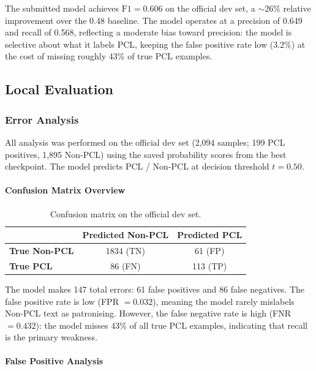 \documentclass[11pt,a4paper]{article}
\begin{document}
The submitted model achieves $\text{F1} = 0.606$ on the official dev set, a $\sim$26\% relative improvement over the 0.48 baseline. The model operates at a precision of 0.649 and recall of 0.568, reflecting a moderate bias toward precision: the model is selective about what it labels PCL, keeping the false positive rate low (3.2\%) at the cost of missing roughly 43\% of true PCL examples.

\subsection{Local Evaluation}

\subsubsection{Error Analysis}

All analysis was performed on the official dev set (2,094 samples; 199 PCL positives, 1,895 Non-PCL) using the saved probability scores from the best checkpoint. The model predicts PCL / Non-PCL at decision threshold $t = 0.50$.

\paragraph{Confusion Matrix Overview}

\begin{table}[H]
    \centering
    \begin{tabular}{lcc}
        \toprule
                              & \textbf{Predicted Non-PCL} & \textbf{Predicted PCL} \\
        \midrule
        \textbf{True Non-PCL} & 1834 (TN)                  & 61 (FP)                \\
        \textbf{True PCL}     & 86 (FN)                    & 113 (TP)               \\
        \bottomrule
    \end{tabular}
    \caption{Confusion matrix on the official dev set.}
    \label{tab:cm}
\end{table}

The model makes 147 total errors: 61 false positives and 86 false negatives. The false positive rate is low (FPR $= 0.032$), meaning the model rarely mislabels Non-PCL text as patronising. However, the false negative rate is high (FNR $= 0.432$): the model misses 43\% of all true PCL examples, indicating that recall is the primary weakness.

\paragraph{False Positive Analysis}
\end{document}
